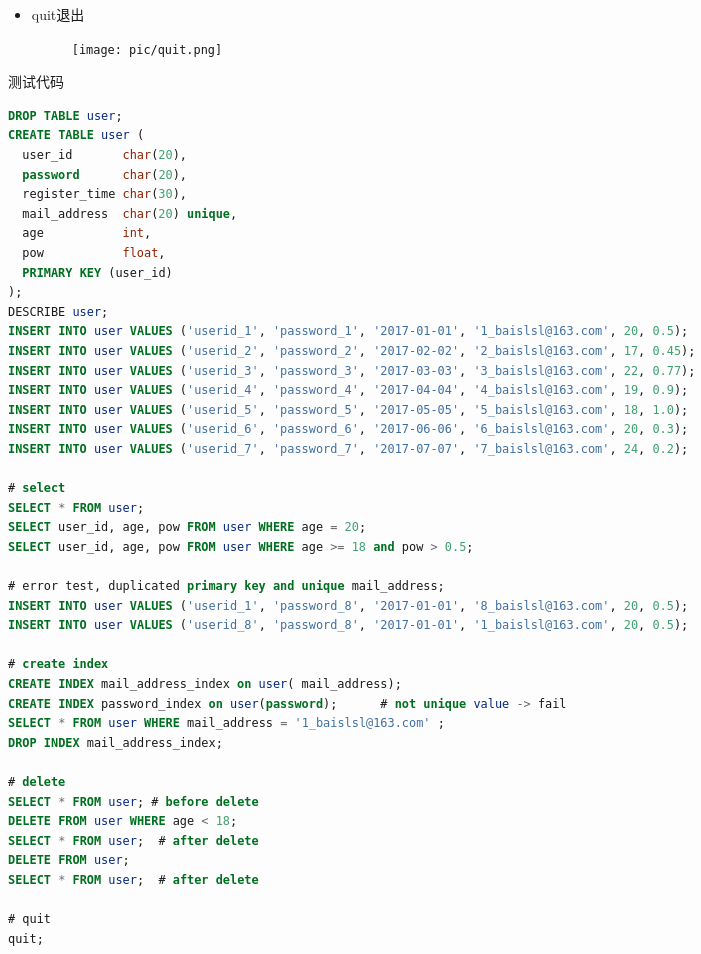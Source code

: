 \documentclass[10pt]{article}
\begin{document}
\begin{CJK}{UTF8}{gkai}
\begin{itemize}
\begin{figure}[H]
\begin{center}
			\end{center}
		\end{figure}
		\item quit退出
		\begin{figure}[H]
			\begin{center}
				\texttt{[image: pic/quit.png]}
			\end{center}
		\end{figure}
	\end{itemize}
测试代码
\begin{lstlisting}[language=sql]
DROP TABLE user;
CREATE TABLE user (
  user_id       char(20),
  password      char(20),
  register_time char(30),
  mail_address  char(20) unique,
  age           int,
  pow           float,
  PRIMARY KEY (user_id)
);
DESCRIBE user;
INSERT INTO user VALUES ('userid_1', 'password_1', '2017-01-01', '1_baislsl@163.com', 20, 0.5);
INSERT INTO user VALUES ('userid_2', 'password_2', '2017-02-02', '2_baislsl@163.com', 17, 0.45);
INSERT INTO user VALUES ('userid_3', 'password_3', '2017-03-03', '3_baislsl@163.com', 22, 0.77);
INSERT INTO user VALUES ('userid_4', 'password_4', '2017-04-04', '4_baislsl@163.com', 19, 0.9);
INSERT INTO user VALUES ('userid_5', 'password_5', '2017-05-05', '5_baislsl@163.com', 18, 1.0);
INSERT INTO user VALUES ('userid_6', 'password_6', '2017-06-06', '6_baislsl@163.com', 20, 0.3);
INSERT INTO user VALUES ('userid_7', 'password_7', '2017-07-07', '7_baislsl@163.com', 24, 0.2);

# select
SELECT * FROM user;
SELECT user_id, age, pow FROM user WHERE age = 20;
SELECT user_id, age, pow FROM user WHERE age >= 18 and pow > 0.5;

# error test, duplicated primary key and unique mail_address;
INSERT INTO user VALUES ('userid_1', 'password_8', '2017-01-01', '8_baislsl@163.com', 20, 0.5);
INSERT INTO user VALUES ('userid_8', 'password_8', '2017-01-01', '1_baislsl@163.com', 20, 0.5);

# create index 
CREATE INDEX mail_address_index on user( mail_address);
CREATE INDEX password_index on user(password);  	# not unique value -> fail
SELECT * FROM user WHERE mail_address = '1_baislsl@163.com' ;
DROP INDEX mail_address_index;

# delete 
SELECT * FROM user;	# before delete
DELETE FROM user WHERE age < 18;
SELECT * FROM user;  # after delete
DELETE FROM user;
SELECT * FROM user;  # after delete

# quit
quit;

\end{lstlisting}
\end{CJK}
\end{document}

